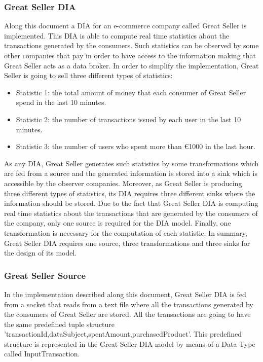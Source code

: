 \subsubsection{Great Seller DIA}
Along this document a DIA for an e-commerce company called Great Seller is implemented. This DIA is able to compute real time statistics about the transactions generated by the consumers. Such statistics can be observed by some other companies that pay in order to have access to the information making that Great Seller acts as a data broker. In order to simplify the implementation, Great Seller is going to sell three different types of statistics:

\begin{itemize}

\item Statistic 1: the total amount of money that each consumer of Great Seller spend in the last 10 minutes.
\item Statistic 2: the number of transactions issued by each user in the last 10 minutes.
\item Statistic 3: the number of users who spent more than \euro{1000} in the last hour.

\end{itemize}

As any DIA, Great Seller generates such statistics by some transformations which are fed from a source and the generated information is stored into a sink which is accessible by the observer companies. Moreover, as Great Seller is producing three different types of statistics, its DIA requires three different sinks where the information should be stored. Due to the fact that Great Seller DIA is computing real time statistics about the transactions that are generated by the consumers of the company, only one source is required for the DIA model. Finally, one transformation is necessary for the computation of each statistic. In summary, Great Seller DIA requires one source, three transformations and three sinks for the design of its model.

\subsubsection*{Great Seller Source}
In the implementation described along this document, Great Seller DIA is fed from a socket that reads from a text file where all the transactions generated by the consumers of Great Seller are stored. All the transactions are going to have the same predefined tuple structure 'transactionId,dataSubject,spentAmount,purchasedProduct'. This predefined structure is represented in the Great Seller DIA model by means of a Data Type called InputTransaction.


